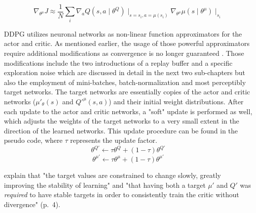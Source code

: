 \begin{equation*}
                    \nabla_{\theta^\mu} J \approx \frac{1}{N}
                    \sum_i{\nabla_a Q(s, a \mid \theta^Q) 
                    \mid_{s = s_i, a=\mu(s_i)} \nabla_{\theta^\mu} \mu(s \mid \theta^\mu) \mid_{s_i}}
\end{equation*}
\par
DDPG utilizes neuronal networks as non-linear function approximators for the actor and critic. As mentioned earlier, the usage of those powerful approximators require additional modifications as convergence is no longer guaranteed \cite[p.3]{lillicrap2019continuous}. Those modifications include the two introductions of a replay buffer and a specific exploration noise which are discussed in detail in the next two sub-chapters but also the employment of mini-batches, batch-normalization and most perceptibly target networks. The target networks are essentially copies of the actor and critic networks ($\mu'_\theta(s)$ and $Q'^\mu(s,a)$) and their initial weight distributions. After each update to the actor and critic networks, a "soft" update is performed as well, which adjusts the weights of the target networks to a very small extent in the direction of the learned networks. This update procedure can be found in the pseudo code, where $\tau$ represents the update factor.
    \begin{equation*}
                    \theta^{Q'} \leftarrow \tau \theta^Q
 + (1- \tau) \theta^{Q'}                \end{equation*}
 \begin{equation*}
                    \theta^{\mu'} \leftarrow \tau \theta^\mu
 + (1- \tau) \theta^{\mu'}                
 \end{equation*}


\cite{lillicrap2019continuous} explain that "the target values are constrained to change slowly, greatly improving the stability of learning" and "that having both a target $\mu'$ and $Q'$ was \textit{required} to have stable targets in order to consistently train the critic without divergence" (p.~4).